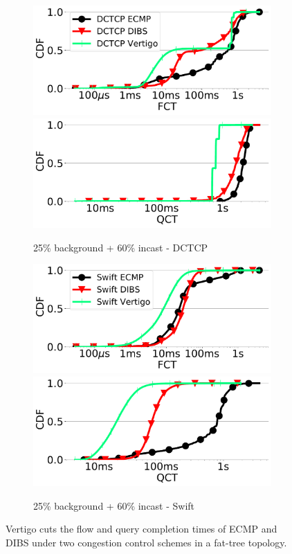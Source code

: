 \begin{figure}[t]
    \begin{subfigure}[t]{.48\linewidth}
	\centering
	\includegraphics[width=0.49\linewidth]{figs/fattree25_85dctcpfctcdf.pdf}
	\includegraphics[width=0.49\linewidth]{figs/fattree25_85dctcpqctcdf.pdf}
		\caption{\small{25\% background + 60\% incast - DCTCP}}
		\label{fig:fattreedc85}
	\end{subfigure}
	\begin{subfigure}[t]{.48\linewidth}
	\centering
	\includegraphics[width=0.49\linewidth]{figs/fattree25_85swiftfctcdf.pdf}
	\includegraphics[width=0.49\linewidth]{figs/fattree25_85swiftqctcdf.pdf}
		\caption{\small{25\% background + 60\% incast - Swift}}
		\label{fig:fattreesw85}
	\end{subfigure}
	\caption{\small{Vertigo cuts the flow and query completion times of ECMP and DIBS under two congestion control schemes in a fat-tree topology.}}
	\vspace{-5mm}
	\label{fig:fattree}
\end{figure}


